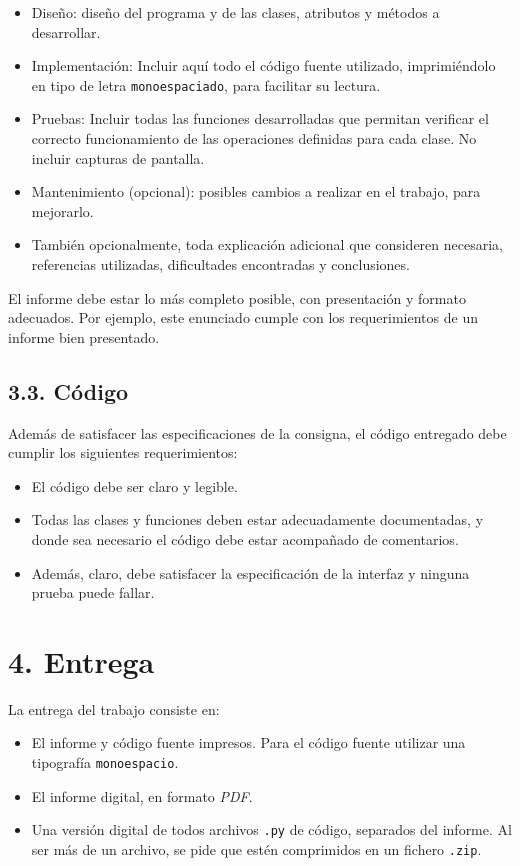 \documentclass[12pt,spanish,]{article}
\begin{document}
\begin{itemize}
\item
  Diseño: diseño del programa y de las clases, atributos y métodos a
  desarrollar.
\item
  Implementación: Incluir aquí todo el código fuente utilizado,
  imprimiéndolo en tipo de letra \texttt{monoespaciado}, para facilitar
  su lectura.
\item
  Pruebas: Incluir todas las funciones desarrolladas que permitan
  verificar el correcto funcionamiento de las operaciones definidas para
  cada clase. No incluir capturas de pantalla.
\item
  Mantenimiento (opcional): posibles cambios a realizar en el trabajo,
  para mejorarlo.
\item
  También opcionalmente, toda explicación adicional que consideren
  necesaria, referencias utilizadas, dificultades encontradas y
  conclusiones.
\end{itemize}

El informe debe estar lo más completo posible, con presentación y
formato adecuados. Por ejemplo, este enunciado cumple con los
requerimientos de un informe bien presentado.

\subsection{3.3. Código}\label{cuxf3digo}

Además de satisfacer las especificaciones de la consigna, el código
entregado debe cumplir los siguientes requerimientos:

\begin{itemize}
\item
  El código debe ser claro y legible.
\item
  Todas las clases y funciones deben estar adecuadamente documentadas, y
  donde sea necesario el código debe estar acompañado de comentarios.
\item
  Además, claro, debe satisfacer la especificación de la interfaz y
  ninguna prueba puede fallar.
\end{itemize}

\section{4. Entrega}\label{entrega}

La entrega del trabajo consiste en:

\begin{itemize}
\item
  El informe y código fuente impresos. Para el código fuente utilizar
  una tipografía \texttt{monoespacio}.
\item
  El informe digital, en formato \emph{PDF}.
\item
  Una versión digital de todos archivos \texttt{.py} de código,
  separados del informe. Al ser más de un archivo, se pide que estén
  comprimidos en un fichero \texttt{.zip}.
\end{itemize}
\end{document}
